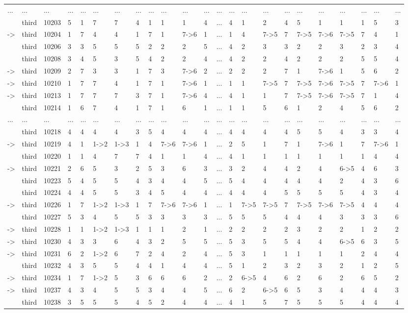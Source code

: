 \begin{landscape}
{\begin{longtable}{lllllllllllllllllllllll}
...&...&...&...&...&...&...&...&...&...&...&...&...&...&...&...&...&...&...&...&...&...&...\tabularnewline
&third&10203&5&1&7&7&4&1&1&1&4&...&4&1&2&4&5&1&1&1&5&3\tabularnewline
-\textgreater &third&10204&1&7&4&4&1&7&1&7-\textgreater 6&1&...&1&4&7-\textgreater 5&7&7-\textgreater 5&7-\textgreater 6&7-\textgreater 5&7&4&1\tabularnewline
&third&10206&3&3&5&5&5&2&2&2&5&...&4&2&3&3&2&2&3&2&3&4\tabularnewline
&third&10208&3&4&5&3&5&4&2&2&4&...&4&2&2&4&2&2&2&5&5&4\tabularnewline
-\textgreater &third&10209&2&7&3&3&1&7&3&7-\textgreater 6&2&...&2&2&2&7&1&7-\textgreater 6&1&5&6&2\tabularnewline
-\textgreater &third&10210&1&7&7&4&1&7&1&7-\textgreater 6&1&...&1&1&7-\textgreater 5&7&7-\textgreater 5&7-\textgreater 6&7-\textgreater 5&7&7-\textgreater 6&1\tabularnewline
-\textgreater &third&10213&1&7&7&7&3&7&1&7-\textgreater 6&4&...&4&1&1&7&7-\textgreater 5&7-\textgreater 6&7-\textgreater 5&7&1&4\tabularnewline
&third&10214&1&6&7&4&1&7&1&6&1&...&1&1&5&6&1&2&4&5&6&2\tabularnewline
...&...&...&...&...&...&...&...&...&...&...&...&...&...&...&...&...&...&...&...&...&...&...\tabularnewline
&third&10218&4&4&4&4&3&5&4&4&4&...&4&4&4&4&5&5&4&3&3&4\tabularnewline
-\textgreater &third&10219&4&1&1-\textgreater 2&1-\textgreater 3&1&4&7-\textgreater 6&7-\textgreater 6&1&...&2&5&1&7&1&7-\textgreater 6&1&7&7-\textgreater 6&1\tabularnewline
&third&10220&1&1&4&7&7&4&1&1&4&...&4&1&1&1&1&1&1&1&4&4\tabularnewline
\newpage
-\textgreater &third&10221&2&6&5&3&2&5&3&6&3&...&3&2&4&4&2&4&6-\textgreater 5&4&6&3\tabularnewline
&third&10223&5&4&5&5&4&3&4&4&5&...&5&4&4&4&4&4&2&4&3&6\tabularnewline
&third&10224&4&4&5&5&3&4&5&4&4&...&4&4&4&5&5&5&5&4&3&4\tabularnewline
-\textgreater &third&10226&1&7&1-\textgreater 2&1-\textgreater 3&1&7&7-\textgreater 6&7-\textgreater 6&1&...&1&7-\textgreater 5&7-\textgreater 5&7&7-\textgreater 5&7-\textgreater 6&7-\textgreater 5&4&4&4\tabularnewline
&third&10227&5&3&4&5&5&3&3&3&3&...&5&5&5&4&4&4&3&3&3&6\tabularnewline
-\textgreater &third&10228&1&1&1-\textgreater 2&1-\textgreater 3&1&1&1&2&1&...&2&2&2&2&3&2&2&1&2&2\tabularnewline
-\textgreater &third&10230&4&3&3&6&4&3&2&5&5&...&5&3&5&5&4&4&6-\textgreater 5&6&3&5\tabularnewline
-\textgreater &third&10231&6&2&1-\textgreater 2&6&7&2&4&2&4&...&5&3&1&1&1&1&1&2&4&4\tabularnewline
&third&10232&4&3&5&5&4&4&1&4&4&...&5&1&2&3&2&3&2&1&2&5\tabularnewline
-\textgreater &third&10234&1&7&1-\textgreater 2&5&3&6&6&6&2&...&2&6-\textgreater 5&4&6&2&6&2&6&5&2\tabularnewline
-\textgreater &third&10237&4&3&4&5&5&3&4&4&5&...&6&2&6-\textgreater 5&6&5&3&4&4&4&3\tabularnewline
&third&10238&3&5&5&5&4&5&2&4&4&...&4&1&5&7&5&5&5&4&4&4\tabularnewline
\hline
\end{longtable}}\end{landscape}


